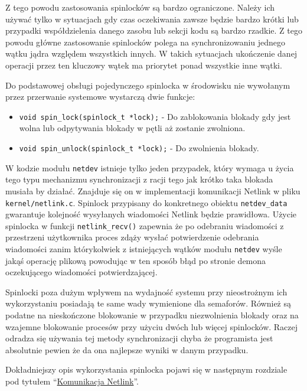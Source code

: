 Z tego powodu zastosowania spinlocków są bardzo ograniczone. Należy ich
używać tylko w sytuacjach gdy czas oczekiwania zawsze będzie bardzo
krótki lub przypadki współdzielenia danego zasobu lub sekcji kodu są
bardzo rzadkie. Z tego powodu główne zastosowanie spinlocków polega na
synchronizowaniu jednego wątku jądra względem wszystkich innych. W
takich sytuacjach ukończenie danej operacji przez ten kluczowy wątek ma
priorytet ponad wszystkie inne wątki.

Do podstawowej obsługi pojedynczego spinlocka w środowisku nie wywołanym
przez przerwanie systemowe wystarczą dwie funkcje:

\begin{itemize}
\itemsep1pt\parskip0pt
\item
  \texttt{void spin\_lock(spinlock\_t *lock);} - Do zablokowania blokady
  gdy jest wolna lub odpytywania blokady w pętli aż zostanie zwolniona.
\item
  \texttt{void spin\_unlock(spinlock\_t *lock);} - Do zwolnienia
  blokady.
\end{itemize}

W kodzie modułu \texttt{netdev} istnieje tylko jeden przypadek, który
wymaga u życia tego typu mechanizmu synchronizacji z racji tego jak
krótko taka blokada musiała by działać. Znajduje się on w implementacji
komunikacji Netlink w pliku \texttt{kernel/netlink.c}. Spinlock
przypisany do konkretnego obiektu \texttt{netdev\_data} gwarantuje
kolejność wysyłanych wiadomości Netlink będzie prawidłowa. Użycie
spinlocka w funkcji \texttt{netlink\_recv()} zapewnia że po odebraniu
wiadomości z przestrzeni użytkownika proces zdąży wysłać potwierdzenie
odebrania wiadomości zanim którykolwiek z istniejących wątków modułu
\texttt{netdev} wyśle jakąś operację plikową powodując w ten sposób błąd
po stronie demona oczekującego wiadomości potwierdzającej.

Spinlocki poza dużym wpływem na wydajność systemu przy nieostrożnym ich
wykorzystaniu posiadają te same wady wymienione dla semaforów. Również
są podatne na nieskończone blokowanie w przypadku niezwolnienia blokady
oraz na wzajemne blokowanie procesów przy użyciu dwóch lub więcej
spinlocków. Raczej odradza się używania tej metody synchronizacji chyba
że programista jest absolutnie pewien że da ona najlepsze wyniki w danym
przypadku.

Dokładniejszy opis wykorzystania spinlocka pojawi się w następnym
rozdziale pod tytułem ``\hyperref[komunikacja-netlink]{Komunikacja
Netlink}''.

